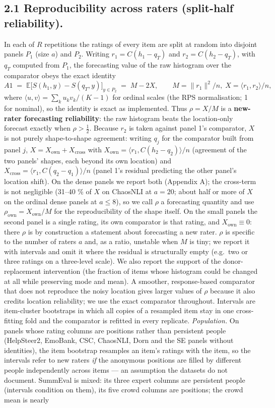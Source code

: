 \documentclass[10pt]{article}
\begin{document}
\subsection*{2.1 Reproducibility across raters (split-half reliability).} In each of \(R\) repetitions the ratings of every item are split at random into disjoint panels \(P_1\) (size \(a\)) and \(P_2\). Writing \(r_1 = C(h_1-q_T)\) and \(r_2 = C(h_2-q_T)\), with \(q_T\) computed from \(P_1\), the forecasting value of the raw histogram over the comparator obeys the exact identity \[A1 \;=\; \mathbb E\big[S(h_1,y)-S(q_T,y)\big]_{y\in P_2} \;=\; M - 2X,\qquad M=\|r_1\|^2/n,\; X=\langle r_1,r_2\rangle/n,\] where \(\langle u,v\rangle=\sum_k u_k v_k/(K-1)\) for ordinal scales (the RPS normalisation; 1 for nominal), so the identity is exact as implemented. Thus \(\rho = X/M\) is a \textbf{new-rater forecasting reliability}: the raw histogram beats the location-only forecast exactly when \(\rho>\tfrac12\). Because \(r_2\) is taken against panel 1's comparator, \(X\) is not purely shape-to-shape agreement: writing \(q_j\) for the comparator built from panel \(j\), \(X = X_{\text{own}} + X_{\text{cross}}\) with \(X_{\text{own}}=\langle r_1, C(h_2-q_2)\rangle/n\) (agreement of the two panels' shapes, each beyond its own location) and \(X_{\text{cross}}=\langle r_1, C(q_2-q_1)\rangle/n\) (panel 1's residual predicting the other panel's location shift). On the dense panels we report both (Appendix A); the cross-term is not negligible (31--40 \% of \(X\) on ChaosNLI at \(a=20\); about half or more of \(X\) on the ordinal dense panels at \(a\le 8\)), so we call \(\rho\) a forecasting quantity and use \(\rho_{\text{own}}=X_{\text{own}}/M\) for the reproducibility of the shape itself. On the small panels the second panel is a single rating, its own comparator is that rating, and \(X_{\text{own}}\equiv 0\): there \(\rho\) is by construction a statement about forecasting a new rater. \(\rho\) is specific to the number of raters \(a\) and, as a ratio, unstable when \(M\) is tiny; we report it with intervals and omit it where the residual is structurally empty (e.g.~two or three ratings on a three-level scale). We also report the support of the donor-replacement intervention (the fraction of items whose histogram could be changed at all while preserving mode and mean). A smoother, response-based comparator that does not reproduce the noisy location gives larger values of \(\rho\) because it also credits location reliability; we use the exact comparator throughout. Intervals are item-cluster bootstraps in which all copies of a resampled item stay in one cross-fitting fold and the comparator is refitted in every replicate. \emph{Population.} On panels whose rating columns are positions rather than persistent people (HelpSteer2, EmoBank, CSC, ChaosNLI, Dorn and the SE panels without identities), the item bootstrap resamples an item's ratings with the item, so the intervals refer to new raters \emph{if} the anonymous positions are filled by different people independently across items --- an assumption the datasets do not document. SummEval is mixed: its three expert columns are persistent people (intervals condition on them), its five crowd columns are positions; the crowd mean is nearly 
\end{document}
